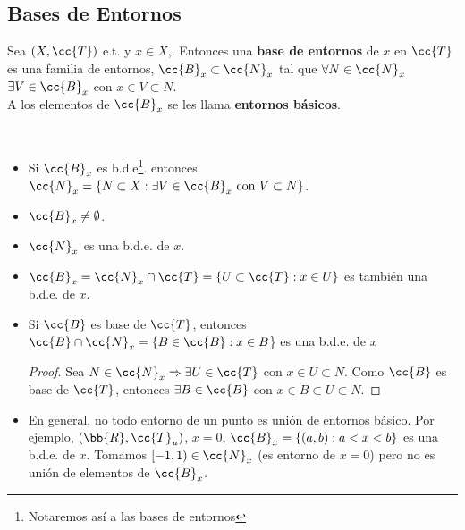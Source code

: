 \subsection{Bases de Entornos}

\begin{definicion}
    Sea $(X, \cc{T})$ e.t. y $x\in X $,. Entonces una \textbf{base de entornos} de $x$ en $\cc{T}$ es una familia de entornos, $\cc{B}_x\subset \cc{N}_x$ tal que $\forall N \in \cc{N}_x$\ \ $\exists V \in \cc{B}_x$ con $x \in V \subset N$.\\

    A los elementos de $\cc{B}_x$ se les llama \textbf{entornos básicos}.
    \endsquare
\end{definicion}

\begin{observacion}\
    \begin{itemize}
        \item Si $\cc{B}_x$ es b.d.e\footnote{Notaremos así a las bases de entornos}. entonces $\cc{N}_x=\{N\subset X : \exists V \in \cc{B}_x \text{ con } V \subset N\}$.

        \item $\cc{B}_x\neq \emptyset$.

        \item $\cc{N}_x$ es una b.d.e. de $x$.

        \item $\cc{B}_x = \cc{N}_x \cap \cc{T}=\{U\subset \cc{T}: x\in U\}$ es también una b.d.e. de $x$.

        \item Si $\cc{B}$ es base de $\cc{T}$, entonces $\cc{B}\cap \cc{N}_x = \{B \in \cc{B} : x \in B$\} es una b.d.e. de $x$
        \begin{proof}
            Sea $N \in \cc{N}_x \Rightarrow \exists U \in \cc{T}$ con $x \in U \subset N$. Como $\cc{B}$ es base de $\cc{T}$, entonces $\exists B \in \cc{B}$ con $x\in B \subset U\subset N$. 
        \end{proof}

        \item En general, no todo entorno de un punto es unión de entornos básico. Por ejemplo, $(\bb{R}, \cc{T}_u)$, $x=0$, $\cc{B}_x = \{(a,b) : a<x<b\}$ es una b.d.e. de $x$. Tomamos $[-1,1) \in \cc{N}_x$ (es entorno de $x=0$) pero no es unión de elementos de $\cc{B}_x$.
    \end{itemize}
    \endsquare
\end{observacion}

